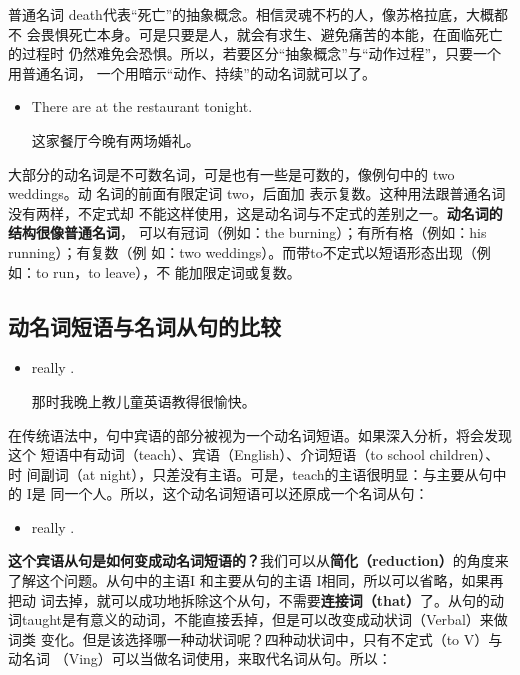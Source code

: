 普通名词 death代表“死亡”的抽象概念。相信灵魂不朽的人，像苏格拉底，大概都不
会畏惧死亡本身。可是只要是人，就会有求生、避免痛苦的本能，在面临死亡的过程时
仍然难免会恐惧。所以，若要区分“抽象概念”与“动作过程”，只要一个用普通名词，
一个用暗示“动作、持续”的动名词就可以了。

\begin{itemize}
\item  There are  at the restaurant tonight.

这家餐厅今晚有两场婚礼。
\end{itemize}

大部分的动名词是不可数名词，可是也有一些是可数的，像例句中的 two weddings。动
名词的前面有限定词 two，后面加 表示复数。这种用法跟普通名词没有两样，不定式却
不能这样使用，这是动名词与不定式的差别之一。\textbf{动名词的结构很像普通名词}，
可以有冠词（例如：the burning）；有所有格（例如：his running）；有复数（例
如：two weddings）。而带to不定式以短语形态出现（例如：to run，to leave），不
能加限定词或复数。

\subsection{动名词短语与名词从句的比较}

\begin{itemize}
\item  {} really  .

  那时我晚上教儿童英语教得很愉快。
\end{itemize}

在传统语法中，句中宾语的部分被视为一个动名词短语。如果深入分析，将会发现这个
短语中有动词（teach）、宾语（English）、介词短语（to school children）、时
间副词（at night），只差没有主语。可是，teach的主语很明显：与主要从句中的 I是
同一个人。所以，这个动名词短语可以还原成一个名词从句：

\begin{itemize}
\item {} really  .
\end{itemize}

\textbf{这个宾语从句是如何变成动名词短语的？}我们可以从\textbf{简化（reduction）}的角度来
了解这个问题。从句中的主语I 和主要从句的主语 I相同，所以可以省略，如果再把动
词去掉，就可以成功地拆除这个从句，不需要\textbf{连接词（that）}了。从句的动
词taught是有意义的动词，不能直接丢掉，但是可以改变成动状词（Verbal）来做词类
变化。但是该选择哪一种动状词呢？四种动状词中，只有不定式（to V）与动名词
（Ving）可以当做名词使用，来取代名词从句。所以：

